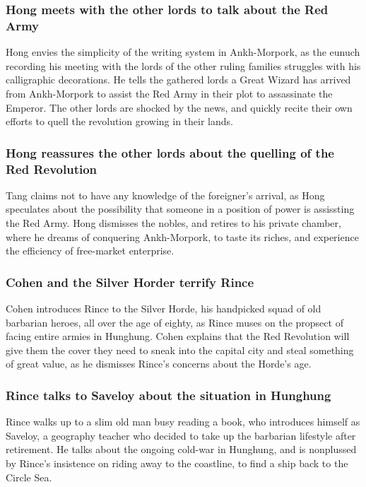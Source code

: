 \subsubsection{\Gls{Hong} meets with the other lords to talk about the Red Army}
\Gls{Hong} envies the simplicity of the writing system in Ankh-Morpork, as the eunuch recording his
meeting with the lords of the other ruling families struggles with his calligraphic decorations.
He tells the gathered lords a Great Wizard has arrived from Ankh-Morpork to assist the Red Army in
their plot to assassinate the Emperor. The other lords are shocked by the news, and quickly recite
their own efforts to quell the revolution growing in their lands.

\subsubsection{\Gls{Hong} reassures the other lords about the quelling of the Red Revolution}
\Gls{Tang} claims not to have any knowledge of the foreigner's arrival, as \Gls{Hong} speculates
about the possibility that someone in a position of power is assissting the Red Army. \Gls{Hong}
dismisses the nobles, and retires to his private chamber, where he dreams of conquering
Ankh-Morpork, to taste its riches, and experience the efficiency of free-market enterprise.

\subsubsection{\Gls{Cohen} and the Silver Horder terrify \Gls{Rince}}
\Gls{Cohen} introduces \Gls{Rince} to the Silver Horde, his handpicked squad of old barbarian
heroes, all over the age of eighty, as \Gls{Rince} muses on the propsect of facing entire armies in
Hunghung. \Gls{Cohen} explains that the Red Revolution will give them the cover they need to sneak
into the capital city and steal something of great value, as he dismisses \Gls{Rince}'s concerns
about the Horde's age.

\subsubsection{\Gls{Rince} talks to \Gls{Saveloy} about the situation in Hunghung}
\Gls{Rince} walks up to a slim old man busy reading a book, who introduces himself as \Gls{Saveloy},
a geography teacher who decided to take up the barbarian lifestyle after retirement. He talks about
the ongoing cold-war in Hunghung, and is nonplussed by \Gls{Rince}'s insistence on riding away to
the coastline, to find a ship back to the Circle Sea.

